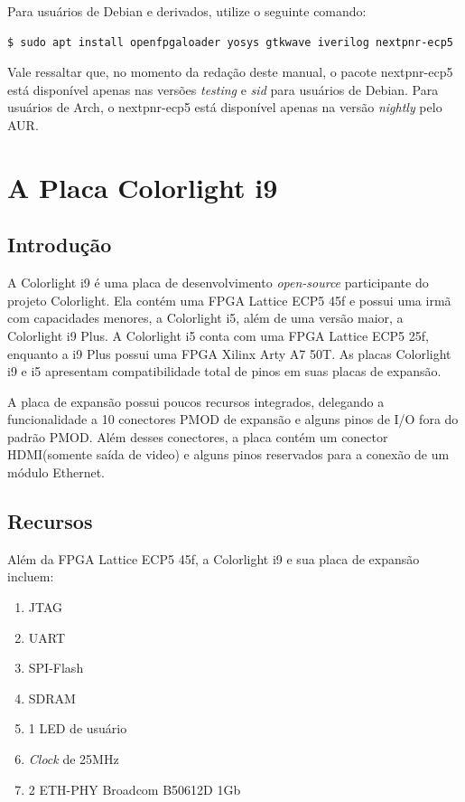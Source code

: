 \documentclass{report}
\begin{document}
Para usuários de Debian e derivados, utilize o seguinte comando:

\begin{lstlisting}[language=bash]
$ sudo apt install openfpgaloader yosys gtkwave iverilog nextpnr-ecp5
\end{lstlisting}

Vale ressaltar que, no momento da redação deste manual, o pacote nextpnr-ecp5 está disponível apenas nas versões \textit{testing} e \textit{sid} para usuários de Debian. Para usuários de Arch, o nextpnr-ecp5 está disponível apenas na versão \textit{nightly} pelo AUR.


\chapter{A Placa Colorlight i9}

\section{Introdução}

A Colorlight i9 é uma placa de desenvolvimento \textit{open-source} participante do projeto Colorlight. Ela contém uma FPGA Lattice ECP5 45f e possui uma irmã com capacidades menores, a Colorlight i5, além de uma versão maior, a Colorlight i9 Plus. A Colorlight i5 conta com uma FPGA Lattice ECP5 25f, enquanto a i9 Plus possui uma FPGA Xilinx Arty A7 50T. As placas Colorlight i9 e i5 apresentam compatibilidade total de pinos em suas placas de expansão.

A placa de expansão possui poucos recursos integrados, delegando a funcionalidade a 10 conectores PMOD de expansão e alguns pinos de I/O fora do padrão PMOD. Além desses conectores, a placa contém um conector HDMI(somente saída de video) e alguns pinos reservados para a conexão de um módulo Ethernet.

\section{Recursos}

Além da FPGA Lattice ECP5 45f, a Colorlight i9 e sua placa de expansão incluem:

\begin{enumerate}
    \item JTAG
    \item UART
    \item SPI-Flash
    \item SDRAM
    \item 1 LED de usuário
    \item \textit{Clock} de 25MHz
    \item 2 ETH-PHY Broadcom B50612D 1Gb
\end{enumerate}
\end{document}
